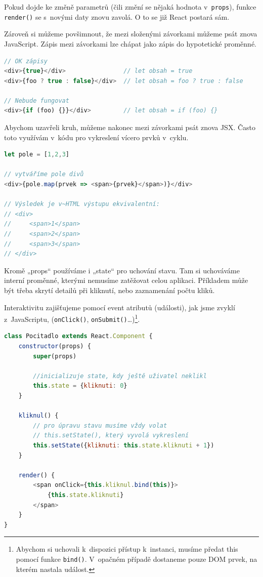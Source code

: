 \documentclass[a4paper,11pt,oneside]{article}
\begin{document}
Pokud dojde ke změně parametrů (čili změní se nějaká hodnota v~\lstinline|props|), funkce \lstinline|render()| se s~novými daty znovu zavolá. O to se již React postará sám.  

\pagebreak
Zároveň si můžeme povšimnout, že mezi složenými závorkami můžeme psát znova JavaScript. Zápis mezi závorkami lze chápat jako zápis do hypotetické proměnné.

\begin{lstlisting}[language=javascript, caption={JavaScript}]
// OK zápisy
<div>{true}</div>                // let obsah = true 
<div>{foo ? true : false}</div>  // let obsah = foo ? true : false

// Nebude fungovat
<div>{if (foo) {}}</div>         // let obsah = if (foo) {}
\end{lstlisting}

Abychom uzavřeli kruh, můžeme nakonec mezi závorkami psát znova JSX. Často toto využívám v~kódu pro vykreslení vícero prvků v~cyklu.

\begin{lstlisting}[language=javascript, caption={JavaScript}]
let pole = [1,2,3]

// vytváříme pole divů
<div>{pole.map(prvek => <span>{prvek}</span>)}</div>  

// Výsledek je v~HTML výstupu ekvivalentní:
// <div>
//     <span>1</span>
//     <span>2</span>
//     <span>3</span>
// </div>
\end{lstlisting}

Kromě „props“ používáme i „state“ pro uchování stavu. Tam si uchováváme interní proměnné, kterými nemusíme zatěžovat celou aplikaci. Příkladem může být třeba skrytí detailů při kliknutí, nebo zaznamenání počtu kliků. 

\pagebreak
Interaktivitu zajišťujeme pomocí event atributů (události), jak jsme zvyklí z~JavaScriptu, (\lstinline|onClick()|, \lstinline|onSubmit()|…)\footnote{Abychom si uchovali k~dispozici přístup k~instanci, musíme předat this pomocí funkce \lstinline|bind()|. V~opačném případě dostaneme pouze DOM prvek, na kterém nastala událost.}. 

\begin{lstlisting}[language=javascript, caption={JavaScript}]
class Pocitadlo extends React.Component {
	constructor(props) {
		super(props)
		
		//inicializuje state, kdy ještě uživatel neklikl
		this.state = {kliknuti: 0}                                
	}
	
	kliknul() {
		// pro úpravu stavu musíme vždy volat 
		// this.setState(), který vyvolá vykreslení
		this.setState({kliknuti: this.state.kliknuti + 1})       
	}
	
	render() {
		<span onClick={this.kliknul.bind(this)}>
			{this.state.kliknuti}
		</span>
	}
}
\end{lstlisting}
\vspace*{\fill}
\pagebreak
\end{document}
